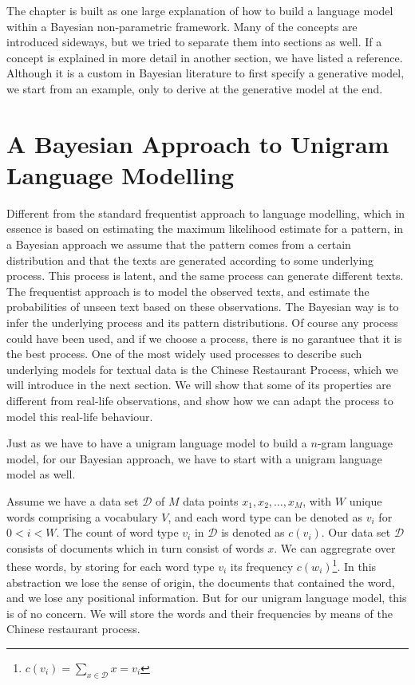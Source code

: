 The chapter is built as one large explanation of how to build a language model within a Bayesian non-parametric framework. Many of the concepts are introduced sideways, but we tried to separate them into sections as well. If a concept is explained in more detail in another section, we have listed a reference. Although it is a custom in Bayesian literature to first specify a generative model, we start from an example, only to derive at the generative model at the end.

\section{A Bayesian Approach to Unigram Language Modelling}

Different from the standard frequentist approach to language modelling, which in essence is based on estimating the maximum likelihood estimate for a pattern, in a Bayesian approach we assume that the pattern comes from a certain distribution and that the texts are generated according to some underlying process. This process is latent, and the same process can generate different texts. The frequentist approach is to model the observed texts, and estimate the probabilities of unseen text based on these observations. The Bayesian way is to infer the underlying process and its pattern distributions. Of course any process could have been used, and if we choose a process, there is no garantuee that it is the best process. One of the most widely used processes to describe such underlying models for textual data is the Chinese Restaurant Process, which we will introduce in the next section. We will show that some of its properties are different from real-life observations, and show how we can adapt the process to model this real-life behaviour.

Just as we have to have a unigram language model to build a $n$-gram language model, for our Bayesian approach, we have to start with a unigram language model as well.

Assume we have a data set $\mathcal{D}$ of $M$ data points $x_1, x_2, \ldots, x_M$, with $W$ unique words comprising a vocabulary $V$, and each word type can be denoted as $v_i$ for $0 < i < W$. The count of word type $v_i$ in $\mathcal{D}$ is denoted as $c(v_i)$. Our data set $\mathcal{D}$ consists of documents which in turn consist of words $x$. We can aggregrate over these words, by storing for each word type $
v_i$ its frequency $c(w_i)$\footnote{$c(v_i) = \sum_{x\in\mathcal{D}} x = v_i$}. In this abstraction we lose the sense of origin, the documents that contained the word, and we lose any positional information. But for our unigram language model, this is of no concern. We will store the words and their frequencies by means of the Chinese restaurant process.

